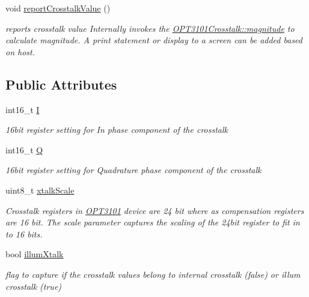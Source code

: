 \begin{DoxyCompactItemize}
void \mbox{\hyperlink{class_o_p_t3101_crosstalk_a50fc2fb4ea51ad52d25bcd3001afb3fc}{report\+Crosstalk\+Value}} ()
\begin{DoxyCompactList}\small\item\em reports crosstalk value Internally invokes the \mbox{\hyperlink{class_o_p_t3101_crosstalk_acb6217116c652bc7c0c84e7b86504f18}{O\+P\+T3101\+Crosstalk\+::magnitude}} to calculate magnitude. A print statement or display to a screen can be added based on host. \end{DoxyCompactList}\end{DoxyCompactItemize}
\subsection*{Public Attributes}
\begin{DoxyCompactItemize}
\item 
int16\+\_\+t \mbox{\hyperlink{class_o_p_t3101_crosstalk_a382c8271e35b33821b22d612466c96c7}{I}}
\begin{DoxyCompactList}\small\item\em 16bit register setting for In phase component of the crosstalk \end{DoxyCompactList}\item 
int16\+\_\+t \mbox{\hyperlink{class_o_p_t3101_crosstalk_a0454e10774015dd2e941f9284ea516da}{Q}}
\begin{DoxyCompactList}\small\item\em 16bit register setting for Quadrature phase component of the crosstalk \end{DoxyCompactList}\item 
uint8\+\_\+t \mbox{\hyperlink{class_o_p_t3101_crosstalk_a5a84d979d127f7624e6f19830b739d5e}{xtalk\+Scale}}
\begin{DoxyCompactList}\small\item\em Crosstalk registers in \mbox{\hyperlink{namespace_o_p_t3101}{O\+P\+T3101}} device are 24 bit where as compensation registers are 16 bit. The scale parameter captures the scaling of the 24bit register to fit in to 16 bits. \end{DoxyCompactList}\item 
bool \mbox{\hyperlink{class_o_p_t3101_crosstalk_ac34c766af7381d501b1716fd8a0076db}{illum\+Xtalk}}
\begin{DoxyCompactList}\small\item\em flag to capture if the crosstalk values belong to internal crosstalk (false) or illum crosstalk (true) \end{DoxyCompactList}\item 

\end{DoxyCompactItemize}
